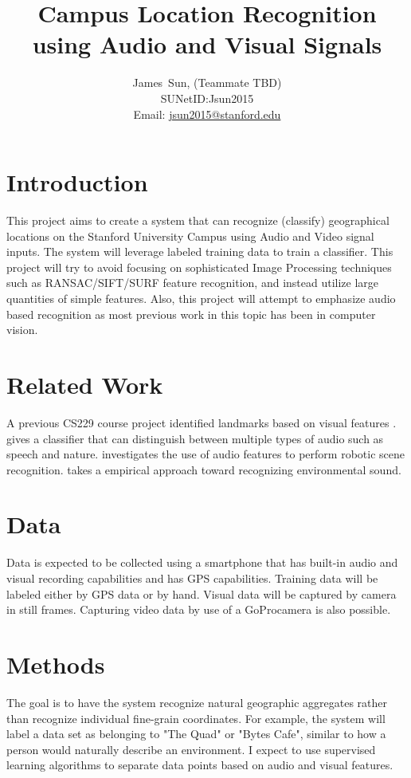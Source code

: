 \documentclass[journal]{IEEEtran}
\begin{document}
\title{Campus Location Recognition using Audio and Visual Signals}

\author{James~Sun, (Teammate TBD)
        \\
        SUNetID:{Jsun2015}\\
        Email: \href{mailto:}{jsun2015@stanford.edu} }


\maketitle




\section{Introduction}
This project aims to create a system that can recognize (classify) geographical locations on the Stanford University Campus using Audio and Video signal inputs. The system will leverage labeled training data to train a classifier. This project will try to avoid focusing on sophisticated Image Processing techniques such as RANSAC/SIFT/SURF feature recognition, and instead utilize large quantities of simple features. Also, this project will attempt to emphasize audio based recognition as most previous work in this topic has been in computer vision.

\section{Related Work}
A previous CS229 course project identified landmarks based on visual features \cite{Crudge:article_typical}. \cite{Chen} gives a classifier that can distinguish between multiple types of audio such as speech and nature. \cite{Chu} investigates the use of audio features to perform robotic scene recognition. \cite{Chu2} takes a empirical approach toward recognizing environmental sound.

\section{Data}
Data is expected to be collected using a smartphone that has built-in audio and visual recording capabilities and has GPS capabilities. Training data will be labeled either by GPS data or by hand. Visual data will be captured by camera in still frames. Capturing video data by use of a GoPro\texttrademark camera is also possible. 

\section{Methods}
The goal is to have the system recognize natural geographic aggregates rather than recognize individual fine-grain coordinates. For example, the system will label a data set as belonging to "The Quad" or "Bytes Cafe", similar to how a person would naturally describe an environment. I expect to use supervised learning algorithms to separate data points based on audio and visual features.
\end{document}

